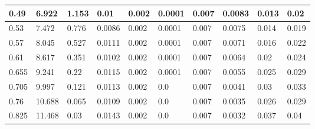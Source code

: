 \begin{sidewaystable}
\begin{tabular}{|p{1cm}|p{1cm}|p{1.5cm}|p{1.5cm}|p{2cm}|p{2cm}|p{1.5cm}|p{1.5cm}|p{2.5cm}|p{2.5cm}|}
		0.49  & 6.922  & 1.153         & 0.01              & 0.002              & 0.0001               & 0.007              & 0.0083                & 0.013             & 0.02                \\ \hline
		0.53  & 7.472  & 0.776         & 0.0086            & 0.002              & 0.0001               & 0.007              & 0.0075                & 0.014             & 0.019               \\ \hline
		0.57  & 8.045  & 0.527         & 0.0111            & 0.002              & 0.0001               & 0.007              & 0.0071                & 0.016             & 0.022               \\ \hline
		0.61  & 8.617  & 0.351         & 0.0102            & 0.002              & 0.0001               & 0.007              & 0.0064                & 0.02              & 0.024               \\ \hline
		0.655 & 9.241  & 0.22          & 0.0115            & 0.002              & 0.0001               & 0.007              & 0.0055                & 0.025             & 0.029               \\ \hline
		0.705 & 9.997  & 0.121         & 0.0113            & 0.002              & 0.0                  & 0.007              & 0.0041                & 0.03              & 0.033               \\ \hline
		0.76  & 10.688 & 0.065         & 0.0109            & 0.002              & 0.0                  & 0.007              & 0.0035                & 0.026             & 0.029               \\ \hline
		0.825 & 11.468 & 0.03          & 0.0143            & 0.002              & 0.0                  & 0.007              & 0.0032                & 0.037             & 0.04                \\ \hline
	\end{tabular}
\end{sidewaystable}


